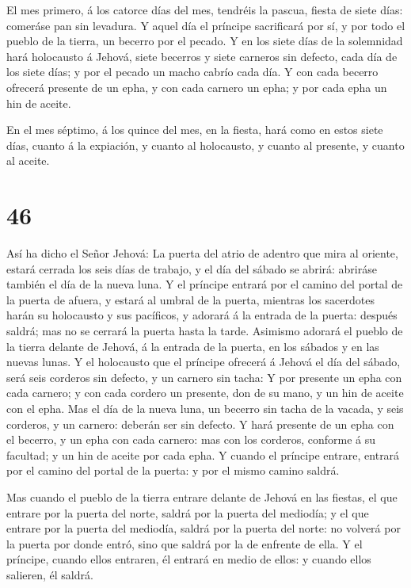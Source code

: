  El mes primero, á los catorce días del mes, tendréis la
pascua, fiesta de siete días: comeráse pan sin levadura.  Y
aquel día el príncipe sacrificará por sí, y por todo el pueblo de la
tierra, un becerro por el pecado.  Y en los siete días de
la solemnidad hará holocausto á Jehová, siete becerros y siete carneros
sin defecto, cada día de los siete días; y por el pecado un macho cabrío
cada día.  Y con cada becerro ofrecerá presente de un epha,
y con cada carnero un epha; y por cada epha un hin de aceite.

 En el mes séptimo, á los quince del mes, en la fiesta,
hará como en estos siete días, cuanto á la expiación, y cuanto al
holocausto, y cuanto al presente, y cuanto al aceite.

\hypertarget{section-45}{%
\section{46}\label{section-45}}

 Así ha dicho el Señor Jehová: La puerta del atrio de
adentro que mira al oriente, estará cerrada los seis días de trabajo, y
el día del sábado se abrirá: abriráse también el día de la nueva luna.
 Y el príncipe entrará por el camino del portal de la puerta
de afuera, y estará al umbral de la puerta, mientras los sacerdotes
harán su holocausto y sus pacíficos, y adorará á la entrada de la
puerta: después saldrá; mas no se cerrará la puerta hasta la tarde.
 Asimismo adorará el pueblo de la tierra delante de Jehová,
á la entrada de la puerta, en los sábados y en las nuevas lunas.
 Y el holocausto que el príncipe ofrecerá á Jehová el día
del sábado, será seis corderos sin defecto, y un carnero sin tacha:
 Y por presente un epha con cada carnero; y con cada cordero
un presente, don de su mano, y un hin de aceite con el epha.
 Mas el día de la nueva luna, un becerro sin tacha de la
vacada, y seis corderos, y un carnero: deberán ser sin defecto.
 Y hará presente de un epha con el becerro, y un epha con
cada carnero: mas con los corderos, conforme á su facultad; y un hin de
aceite por cada epha.  Y cuando el príncipe entrare, entrará
por el camino del portal de la puerta: y por el mismo camino saldrá.

 Mas cuando el pueblo de la tierra entrare delante de Jehová
en las fiestas, el que entrare por la puerta del norte, saldrá por la
puerta del mediodía; y el que entrare por la puerta del mediodía, saldrá
por la puerta del norte: no volverá por la puerta por donde entró, sino
que saldrá por la de enfrente de ella.  Y el príncipe,
cuando ellos entraren, él entrará en medio de ellos: y cuando ellos
salieren, él saldrá.

